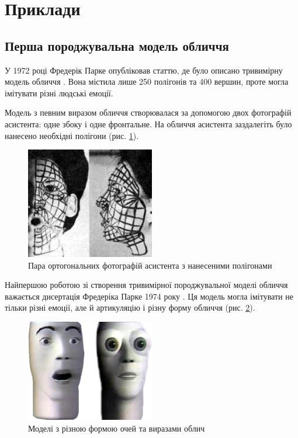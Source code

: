 \section{Приклади}

\subsection{Перша породжувальна модель обличчя}

У 1972 році Фредерік Парке опубліковав статтю,
де було описано тривимірну модель обличчя \cite{Parke:1972}.
Вона містила лише 250 полігонів та 400 вершин,
проте могла імітувати різні людські емоції.

Модель з певним виразом обличчя створювалася за допомогою
двох фотографій асистента: одне збоку і одне фронтальне.
На обличчя асистента заздалегіть було нанесено необхідні полігони
(рис. \ref{fig:parke:face-paint}).
\begin{figure}[h]
  \centering
    \includegraphics[width=0.5\textwidth]{images/Parke-face-paint}
  \caption{Пара ортогональних фотографій асистента з нанесеними полігонами}
  \label{fig:parke:face-paint}
\end{figure}

Найпершою роботою зі створення
тривимірної породжувальної моделі обличчя важається
дисертація Фредеріка Парке 1974 року \cite{Parke:1974}.
Ця модель могла імітувати не тільки різні емоції,
але й артикуляцію і різну форму обличчя
(рис. \ref{fig:parke:face-models}).
\begin{figure}[h]
  \centering
    \includegraphics[width=0.5\textwidth]{images/Parke-faces}
  \caption{Моделі з різною формою очей та виразами облич}
  \label{fig:parke:face-models}
\end{figure}

